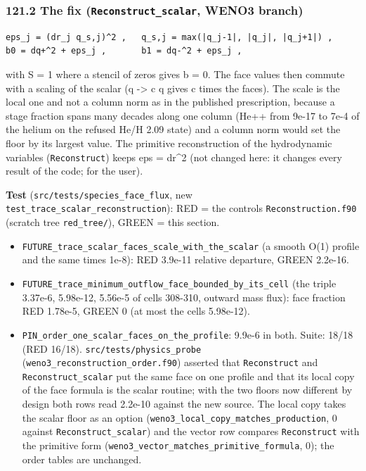 \documentclass[english,a4paper]{my_memo}
\providecommand{\tightlist}{\setlength{\itemsep}{0pt}\setlength{\parskip}{0pt}}
\begin{document}
\subsubsection{\texorpdfstring{121.2 The fix (\texttt{Reconstruct\_scalar}, WENO3 branch)}{121.2 The fix (Reconstruct\_scalar, WENO3 branch)}}\label{1212-the-fix-reconstruct_scalar-weno3-branch}

\begin{verbatim}
eps_j = (dr_j q_s,j)^2 ,   q_s,j = max(|q_j-1|, |q_j|, |q_j+1|) ,
b0 = dq+^2 + eps_j ,       b1 = dq-^2 + eps_j ,
\end{verbatim}

with S = 1 where a stencil of zeros gives b = 0. The face values then commute
with a scaling of the scalar (q -\textgreater{} c q gives c times the faces). The scale is
the local one and not a column norm as in the published prescription,
because a stage fraction spans many decades along one column (He++ from
9e-17 to 7e-4 of the helium on the refused He/H 2.09 state) and a column
norm would set the floor by its largest value. The primitive reconstruction
of the hydrodynamic variables (\texttt{Reconstruct}) keeps eps = dr\^{}2 (not changed
here: it changes every result of the code; for the user).

\textbf{Test} (\texttt{src/tests/species\_face\_flux}, new \texttt{test\_trace\_scalar\_reconstruction}):
RED = the control\textquotesingle s \texttt{Reconstruction.f90} (scratch tree \texttt{red\_tree/}), GREEN =
this section.

\begin{itemize}
\tightlist
\item
  \texttt{FUTURE\_trace\_scalar\_faces\_scale\_with\_the\_scalar} (a smooth O(1) profile
  and the same times 1e-8): RED 3.9e-11 relative departure, GREEN 2.2e-16.
\item
  \texttt{FUTURE\_trace\_minimum\_outflow\_face\_bounded\_by\_its\_cell} (the triple
  3.37e-6, 5.98e-12, 5.56e-5 of cells 308-310, outward mass flux): face
  fraction RED 1.78e-5, GREEN 0 (at most the cell\textquotesingle s 5.98e-12).
\item
  \texttt{PIN\_order\_one\_scalar\_faces\_on\_the\_profile}: 9.9e-6 in both.
  Suite: 18/18 (RED 16/18).
  \texttt{src/tests/physics\_probe} (\texttt{weno3\_reconstruction\_order.f90}) asserted that
  \texttt{Reconstruct} and \texttt{Reconstruct\_scalar} put the same face on one profile and
  that its local copy of the face formula is the scalar routine; with the two
  floors now different by design both rows read 2.2e-10 against the new
  source. The local copy takes the scalar floor as an option
  (\texttt{weno3\_local\_copy\_matches\_production}, 0 against \texttt{Reconstruct\_scalar}) and
  the vector row compares \texttt{Reconstruct} with the primitive form
  (\texttt{weno3\_vector\_matches\_primitive\_formula}, 0); the order tables are
  unchanged.
\end{itemize}
\end{document}
